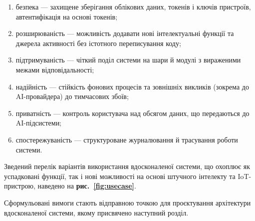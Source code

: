 
\begin{enumerate}[noitemsep, topsep=2pt, leftmargin=*, label=\arabic*)]
    \item безпека — захищене зберігання облікових даних, токенів і ключів пристроїв, автентифікація на основі токенів;
    \item розширюваність — можливість додавати нові інтелектуальні функції та джерела активності без істотного переписування коду;
    \item підтримуваність — чіткий поділ системи на шари й модулі з вираженими межами відповідальності;
    \item надійність — стійкість фонових процесів та зовнішніх викликів (зокрема до AI-провайдера) до тимчасових збоїв;
    \item приватність — контроль користувача над обсягом даних, що передаються до AI-підсистеми;
    \item спостережуваність — структуроване журналювання й трасування роботи системи.
\end{enumerate}

Зведений перелік варіантів використання вдосконаленої системи, що охоплює як успадковані
функції, так і нові можливості на основі штучного інтелекту та IoT-пристрою, наведено на
\textbf{рис.~\ref{fig:usecase}}.


Сформульовані вимоги стають відправною точкою для проєктування архітектури вдосконаленої
системи, якому присвячено наступний розділ.
